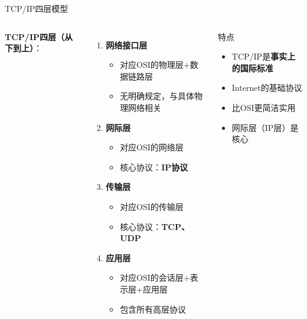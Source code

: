 \documentclass[10pt, aspectratio=169]{beamer}
\begin{document}
\begin{frame}{TCP/IP四层模型}
    \begin{columns}[T]
        \textbf{TCP/IP四层（从下到上）}：
        \begin{enumerate}
            \item \textbf{网络接口层}
            \begin{itemize}
                \item 对应OSI的物理层+数据链路层
                \item 无明确规定，与具体物理网络相关
            \end{itemize}
            \item \textbf{网际层}
            \begin{itemize}
                \item 对应OSI的网络层
                \item 核心协议：\textbf{IP协议}
            \end{itemize}
            \item \textbf{传输层}
            \begin{itemize}
                \item 对应OSI的传输层
                \item 核心协议：\textbf{TCP、UDP}
            \end{itemize}
            \item \textbf{应用层}
            \begin{itemize}
                \item 对应OSI的会话层+表示层+应用层
                \item 包含所有高层协议
            \end{itemize}
        \end{enumerate}
        \begin{block}{特点}
            \begin{itemize}
                \item TCP/IP是\textbf{事实上的国际标准}
                \item Internet的基础协议
                \item 比OSI更简洁实用
                \item 网际层（IP层）是核心
            \end{itemize}
        \end{block}
    \end{columns}
\end{frame}
\end{document}
